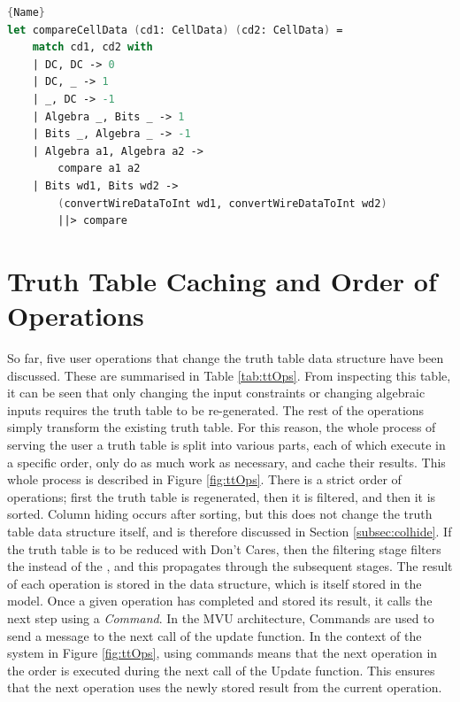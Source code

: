 \begin{lstlisting}[caption=Function to compare two \codestyle{CellData} values,frame=tlrb, language=FSharp, label=lst:compareCellData]{Name}
let compareCellData (cd1: CellData) (cd2: CellData) =
    match cd1, cd2 with
    | DC, DC -> 0
    | DC, _ -> 1
    | _, DC -> -1
    | Algebra _, Bits _ -> 1 
    | Bits _, Algebra _ -> -1
    | Algebra a1, Algebra a2 -> 
        compare a1 a2
    | Bits wd1, Bits wd2 ->
        (convertWireDataToInt wd1, convertWireDataToInt wd2)
        ||> compare
\end{lstlisting}

\section{Truth Table Caching and Order of Operations} \label{sec:cachingTT}
So far, five user operations that change the truth table data structure have been discussed. These are summarised in Table \ref{tab:ttOps}. From inspecting this table, it can be seen that only changing the input constraints or changing algebraic inputs requires the truth table to be re-generated. The rest of the operations simply transform the existing truth table. For this reason, the whole process of serving the user a truth table is split into various parts, each of which execute in a specific order, only do as much work as necessary, and cache their results. This whole process is described in Figure \ref{fig:ttOps}. There is a strict order of operations; first the truth table is regenerated, then it is filtered, and then it is sorted. Column hiding occurs after sorting, but this does not change the truth table data structure itself, and is therefore discussed in Section \ref{subsec:colhide}. If the truth table is to be reduced with Don't Cares, then the filtering stage filters the  instead of the , and this propagates through the subsequent stages. The result of each operation is stored in the  data structure, which is itself stored in the model. Once a given operation has completed and stored its result, it calls the next step using a \textit{Command}. In the MVU architecture, Commands are used to send a message to the next call of the update function. In the context of the system in Figure \ref{fig:ttOps}, using commands means that the next operation in the order is executed during the next call of the Update function. This ensures that the next operation uses the newly stored result from the current operation. 

